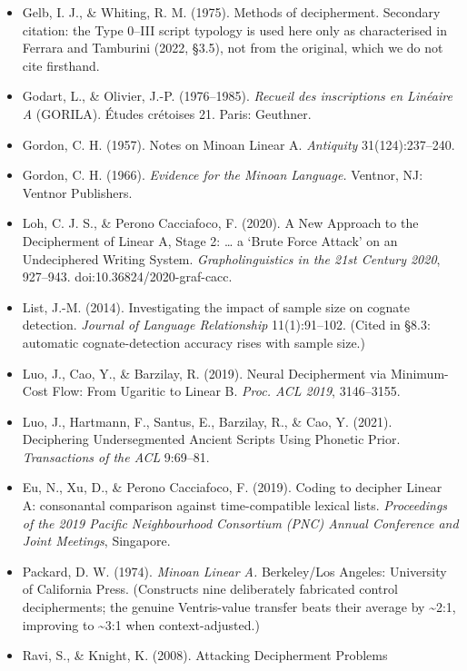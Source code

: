 \documentclass[
  10pt,
]{article}
\begin{document}
\begin{itemize}
  \emph{Historische Sprachforschung} 128(1):42--58.
\item
  Gelb, I. J., \& Whiting, R. M. (1975). Methods of decipherment.
  Secondary citation: the Type 0--III script typology is used here only
  as characterised in Ferrara and Tamburini (2022, §3.5), not from the
  original, which we do not cite firsthand.
\item
  Godart, L., \& Olivier, J.-P. (1976--1985). \emph{Recueil des
  inscriptions en Linéaire A} (GORILA). Études crétoises 21. Paris:
  Geuthner.
\item
  Gordon, C. H. (1957). Notes on Minoan Linear A. \emph{Antiquity}
  31(124):237--240.
\item
  Gordon, C. H. (1966). \emph{Evidence for the Minoan Language.}
  Ventnor, NJ: Ventnor Publishers.
\item
  Loh, C. J. S., \& Perono Cacciafoco, F. (2020). A New Approach to the
  Decipherment of Linear A, Stage 2: \ldots{} a `Brute Force Attack' on
  an Undeciphered Writing System. \emph{Grapholinguistics in the 21st
  Century 2020}, 927--943. doi:10.36824/2020-graf-cacc.
\item
  List, J.-M. (2014). Investigating the impact of sample size on cognate
  detection. \emph{Journal of Language Relationship} 11(1):91--102.
  (Cited in §8.3: automatic cognate-detection accuracy rises with sample
  size.)
\item
  Luo, J., Cao, Y., \& Barzilay, R. (2019). Neural Decipherment via
  Minimum-Cost Flow: From Ugaritic to Linear B. \emph{Proc. ACL 2019},
  3146--3155.
\item
  Luo, J., Hartmann, F., Santus, E., Barzilay, R., \& Cao, Y. (2021).
  Deciphering Undersegmented Ancient Scripts Using Phonetic Prior.
  \emph{Transactions of the ACL} 9:69--81.
\item
  Eu, N., Xu, D., \& Perono Cacciafoco, F. (2019). Coding to decipher
  Linear A: consonantal comparison against time-compatible lexical
  lists. \emph{Proceedings of the 2019 Pacific Neighbourhood Consortium
  (PNC) Annual Conference and Joint Meetings}, Singapore.
\item
  Packard, D. W. (1974). \emph{Minoan Linear A.} Berkeley/Los Angeles:
  University of California Press. (Constructs nine deliberately
  fabricated control decipherments; the genuine Ventris-value transfer
  beats their average by \textasciitilde2:1, improving to
  \textasciitilde3:1 when context-adjusted.)
\item
  Ravi, S., \& Knight, K. (2008). Attacking Decipherment Problems

\end{itemize}
\end{document}

